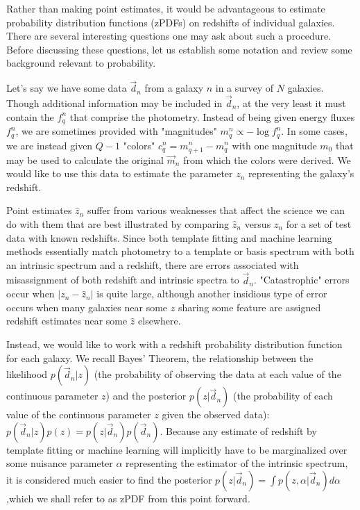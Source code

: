 \documentclass[12pt, onecolumn]{emulateapj}
\begin{document}
Rather than making point estimates, it would be advantageous to estimate probability distribution functions (zPDFs) on redshifts of individual galaxies.  There are several interesting questions one may ask about such a procedure.  Before discussing these questions, let us establish some notation and review some background relevant to probability.

Let's say we have some data $\vec{d}_{n}$ from a galaxy $n$ in a survey of $N$ galaxies.  Though additional information may be included in $\vec{d}_{n}$, at the very least it must contain the $f_{q}^{n}$ that comprise the photometry.  Instead of being given energy fluxes $f_{q}^{n}$, we are sometimes provided with "magnitudes" $m_{q}^{n}\propto -\log f_{q}^{n}$.  In some cases, we are instead given $Q-1$ "colors" $c_{q}^{n}=m_{q+1}^{n}-m_{q}^{n}$ with one magnitude $m_{0}$ that may be used to calculate the original $\vec{m}_{n}$ from which the colors were derived.  We would like to use this data to estimate the parameter $z_{n}$ representing the galaxy's redshift.  

Point estimates $\hat{z}_{n}$ suffer from various weaknesses that affect the science we can do with them that are best illustrated by comparing $\hat{z}_{n}$ versus $z_{n}$ for a set of test data with known redshifts.  Since both template fitting and machine learning methods essentially match photometry to a template or basis spectrum with both an intrinsic spectrum and a redshift, there are errors associated with misassignment of both redshift and intrinsic spectra to $\vec{d}_{n}$.  "Catastrophic" errors occur when $|z_{n}-\hat{z}_{n}|$ is quite large, although another insidious type of error occurs when many galaxies near some $z$ sharing some feature are assigned redshift estimates near some $\hat{z}$ elsewhere. 

Instead, we would like to work with a redshift probability distribution function for each galaxy.  We recall Bayes' Theorem, the relationship between the likelihood $p(\vec{d}_{n}|z)$ (the probability of observing the data at each value of the continuous parameter $z$) and the posterior $p(z|\vec{d}_{n})$ (the probability of each value of the continuous parameter $z$ given the observed data): $p(\vec{d}_{n}|z)p(z)=p(z|\vec{d}_{n})p(\vec{d}_{n})$.  Because any estimate of redshift by template fitting or machine learning will implicitly have to be marginalized over some nuisance parameter $\alpha$ representing the estimator of the intrinsic spectrum, it is considered much easier to find the posterior $p(z|\vec{d}_{n})=\int p(z,\alpha|\vec{d}_{n})d\alpha$,which we shall refer to as zPDF from this point forward.
\end{document}
